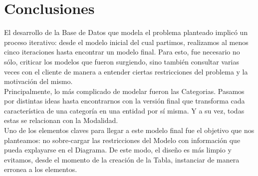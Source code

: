 \section{Conclusiones}

El desarrollo de la Base de Datos que modela el problema planteado implicó un proceso iterativo: desde el modelo inicial del cual partimos, realizamos al menos cinco iteraciones hasta encontrar un modelo final. Para esto, fue necesario no sólo, criticar los modelos que fueron surgiendo, sino también consultar varias veces con el cliente de manera a entender ciertas restricciones del problema y la motivación del mismo.\\

Principalmente, lo más complicado de modelar fueron las Categorias. Pasamos por distintas ideas hasta encontrarnos con la versión final que transforma cada característica de una categoría en una entidad por sí misma. Y a su vez, todas estas se relacionan con la Modalidad. \\

Uno de los elementos claves para llegar a este modelo final fue el objetivo que nos planteamos: no sobre-cargar las restricciones del Modelo con información que pueda explayarse en el Diagrama. De este modo, el diseño es más limpio y evitamos, desde el momento de la creación de la Tabla, instanciar de manera erronea a los elementos.\\